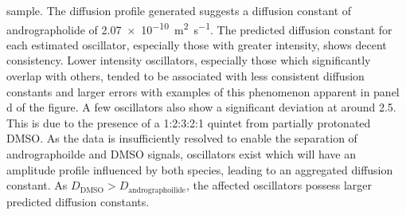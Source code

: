 sample\cite{Chen1998}.
The diffusion profile generated suggests a diffusion constant of andrographolide of
\qty{2.07e-10}{\meter\squared\per\second}. The predicted diffusion constant for
each estimated oscillator, especially those with greater intensity, shows
decent consistency.
Lower intensity oscillators, especially those which
significantly overlap with others, tended to be associated with
less consistent diffusion constants and larger errors with examples of this
phenomenon apparent in panel d of the figure. A few oscillators also show a
significant deviation at around \qty{2.5}{\partspermillion}. This is due to the
presence of a 1:2:3:2:1 quintet from partially protonated \acs{DMSO}. As the
data is insufficiently resolved to enable the separation of andrographoilde and
\acs{DMSO} signals, oscillators exist which will have an amplitude profile
influenced by both species, leading to an aggregated diffusion constant. As
$D_{\text{DMSO}} > D_{\text{andrographoilide}}$, the affected oscillators
possess larger predicted diffusion constants.

